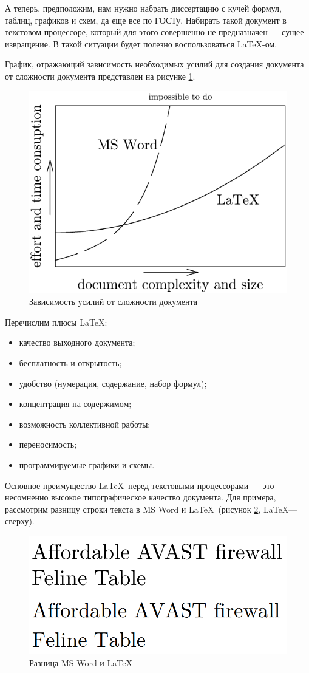 А теперь, предположим, нам нужно набрать диссертацию с кучей формул, таблиц, графиков и схем, да еще все по ГОСТу. Набирать такой документ в текстовом процессоре, который для этого совершенно не предназначен --- сущее извращение. В такой ситуации будет полезно воспользоваться \LaTeX-ом.

График, отражающий зависимость необходимых усилий для создания документа от сложности документа представлен на рисунке \ref{fig:graph}.

\begin{figure}[ht]
    \includegraphics[width=.6\linewidth]{Figures/graph.png}
    \caption{Зависимость усилий от сложности документа}
    \label{fig:graph}
\end{figure}

Перечислим плюсы \LaTeX:

\begin{itemize}
    \item качество выходного документа;
    \item бесплатность и открытость;
    \item удобство (нумерация, содержание, набор формул);
    \item концентрация на содержимом;
    \item возможность коллективной работы;
    \item переносимость;
    \item программируемые графики и схемы.
\end{itemize}

Основное преимущество \LaTeX~перед текстовыми процессорами --- это несомненно высокое типографическое качество документа. Для примера, рассмотрим разницу строки текста в MS Word и \LaTeX~(рисунок \ref{fig:difference}, \LaTeX --- сверху).

\begin{figure}[ht]
    \includegraphics[width=.6\linewidth]{Figures/difference.png}
    \caption{Разница MS Word и \LaTeX}
    \label{fig:difference}
\end{figure}

